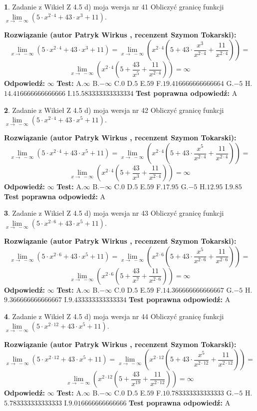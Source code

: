 \documentclass[12pt, a4paper]{article}
\theoremstyle{definition} %
\newtheorem{zad}{}
\newcommand{\zadStart}[1]{\begin{zad}#1\newline}
\newcommand{\zadStop}{\end{zad}}
\newcommand{\rozwStart}[2]{\noindent \textbf{Rozwiązanie (autor #1 , recenzent #2): }\newline}
\newcommand{\rozwStop}{\newline}
\newcommand{\odpStart}{\noindent \textbf{Odpowiedź:}\newline}
\newcommand{\odpStop}{\newline}
\newcommand{\testStart}{\noindent \textbf{Test:}\newline}
\newcommand{\testStop}{\newline}
\newcommand{\kluczStart}{\noindent \textbf{Test poprawna odpowiedź:}\newline}
\newcommand{\kluczStop}{\newline}
\begin{document}
\zadStart{Zadanie z Wikieł Z 4.5 d) moja wersja nr 41}
Obliczyć granicę funkcji  $\lim\limits_{x\to\ -\infty}(5 \cdot x^{2\cdot4}+43 \cdot x^{3}+11)$.
\zadStop
\rozwStart{Patryk Wirkus}{Szymon Tokarski}
$$\lim\limits_{x\to\ -\infty}(5 \cdot x^{2\cdot4}+43 \cdot x^{3}+11) = \lim\limits_{x\to\ -\infty}(x^{2\cdot4}(5 +43 \cdot \frac{x^{3}}{x^{2\cdot4}}+\frac{11}{x^{2\cdot4}})) =$$ $$\lim\limits_{x\to\ -\infty}(x^{2\cdot4}(5 +\frac{43}{x^{5}}+\frac{11}{x^{2\cdot4}})) =\infty$$
\rozwStop
\odpStart
$\infty$
\odpStop
\testStart
A.$\infty$ B.$-\infty$ C.$0$ D.$5$ E.$59$
F.$19.416666666666664$ G.$-5$
H.$14.416666666666666$
I.$15.583333333333334$
\testStop
\kluczStart
A
\kluczStop



\zadStart{Zadanie z Wikieł Z 4.5 d) moja wersja nr 42}
Obliczyć granicę funkcji  $\lim\limits_{x\to\ -\infty}(5 \cdot x^{2\cdot4}+43 \cdot x^{5}+11)$.
\zadStop
\rozwStart{Patryk Wirkus}{Szymon Tokarski}
$$\lim\limits_{x\to\ -\infty}(5 \cdot x^{2\cdot4}+43 \cdot x^{5}+11) = \lim\limits_{x\to\ -\infty}(x^{2\cdot4}(5 +43 \cdot \frac{x^{5}}{x^{2\cdot4}}+\frac{11}{x^{2\cdot4}})) =$$ $$\lim\limits_{x\to\ -\infty}(x^{2\cdot4}(5 +\frac{43}{x^{3}}+\frac{11}{x^{2\cdot4}})) =\infty$$
\rozwStop
\odpStart
$\infty$
\odpStop
\testStart
A.$\infty$ B.$-\infty$ C.$0$ D.$5$ E.$59$
F.$17.95$ G.$-5$
H.$12.95$
I.$9.85$
\testStop
\kluczStart
A
\kluczStop



\zadStart{Zadanie z Wikieł Z 4.5 d) moja wersja nr 43}
Obliczyć granicę funkcji  $\lim\limits_{x\to\ -\infty}(5 \cdot x^{2\cdot6}+43 \cdot x^{5}+11)$.
\zadStop
\rozwStart{Patryk Wirkus}{Szymon Tokarski}
$$\lim\limits_{x\to\ -\infty}(5 \cdot x^{2\cdot6}+43 \cdot x^{5}+11) = \lim\limits_{x\to\ -\infty}(x^{2\cdot6}(5 +43 \cdot \frac{x^{5}}{x^{2\cdot6}}+\frac{11}{x^{2\cdot6}})) =$$ $$\lim\limits_{x\to\ -\infty}(x^{2\cdot6}(5 +\frac{43}{x^{7}}+\frac{11}{x^{2\cdot6}})) =\infty$$
\rozwStop
\odpStart
$\infty$
\odpStop
\testStart
A.$\infty$ B.$-\infty$ C.$0$ D.$5$ E.$59$
F.$14.366666666666667$ G.$-5$
H.$9.366666666666667$
I.$9.433333333333334$
\testStop
\kluczStart
A
\kluczStop



\zadStart{Zadanie z Wikieł Z 4.5 d) moja wersja nr 44}
Obliczyć granicę funkcji  $\lim\limits_{x\to\ -\infty}(5 \cdot x^{2\cdot12}+43 \cdot x^{5}+11)$.
\zadStop
\rozwStart{Patryk Wirkus}{Szymon Tokarski}
$$\lim\limits_{x\to\ -\infty}(5 \cdot x^{2\cdot12}+43 \cdot x^{5}+11) = \lim\limits_{x\to\ -\infty}(x^{2\cdot12}(5 +43 \cdot \frac{x^{5}}{x^{2\cdot12}}+\frac{11}{x^{2\cdot12}})) =$$ $$\lim\limits_{x\to\ -\infty}(x^{2\cdot12}(5 +\frac{43}{x^{19}}+\frac{11}{x^{2\cdot12}})) =\infty$$
\rozwStop
\odpStart
$\infty$
\odpStop
\testStart
A.$\infty$ B.$-\infty$ C.$0$ D.$5$ E.$59$
F.$10.783333333333333$ G.$-5$
H.$5.783333333333333$
I.$9.016666666666666$
\testStop
\kluczStart
A
\kluczStop
\end{document}
